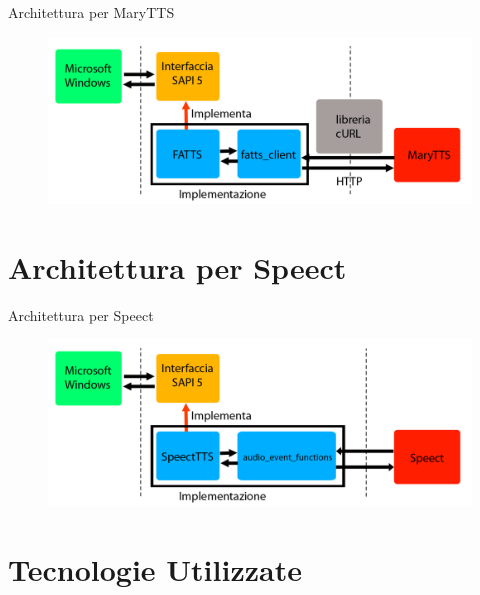 \documentclass{beamer}
\begin{document}
	\begin{frame}{Architettura per MaryTTS}
		\begin{figure}[H]
			\centering
			\includegraphics[width=\textwidth]{images/FATTS-sapi5.png}
		\end{figure}
	\end{frame}

	\section{Architettura per Speect}
	
	\begin{frame}{Architettura per Speect}
		\begin{figure}[H]
			\centering
			\includegraphics[width=\textwidth]{images/SpeectTTS-sapi5.png}
		\end{figure}
	\end{frame}

	\section{Tecnologie Utilizzate}
	
\end{document}
